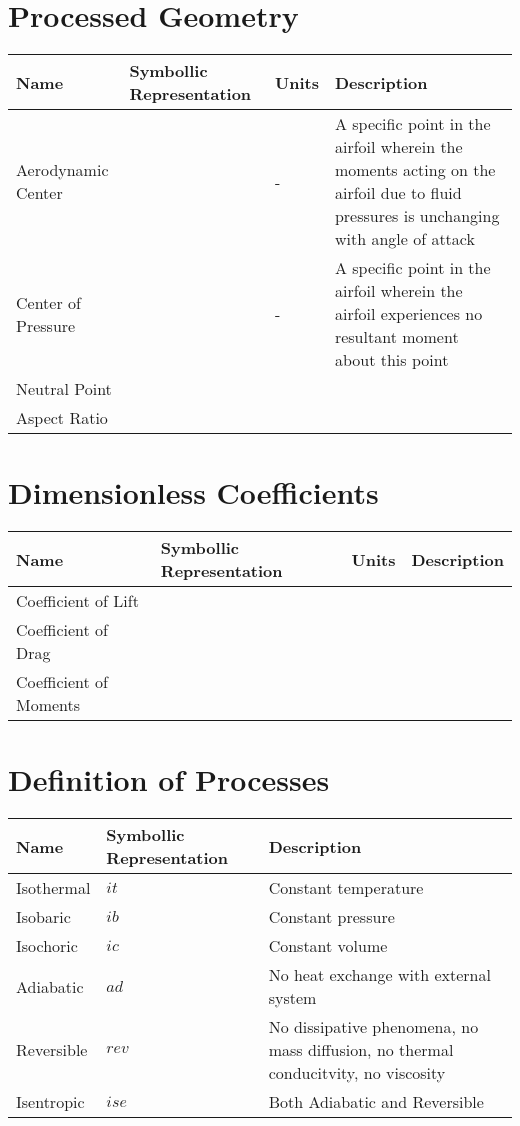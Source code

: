 \documentclass[class=report, 12pt, crop=false]{standalone}
\begin{document}
\begin{center}
\section{Processed Geometry}
\begin{comment}
\end{comment}
\begin{tabular}{|m{\tabsize}|m{\tabsize}|m{\tabsize}|m{\tabsizel}|}
\hline
Name & Symbollic Representation & Units & Description \\
\hline
Aerodynamic Center &  & - & A specific point in the airfoil wherein the moments acting on the airfoil due to fluid pressures is unchanging with angle of attack \\ 
\hline
Center of Pressure & & - & A specific point in the airfoil wherein the airfoil experiences no resultant moment about this point\\ 
\hline
Neutral Point & & & \\ 
\hline
Aspect Ratio & & & \\ 
\hline
\end{tabular}
\section{Dimensionless Coefficients}
\begin{comment}
\end{comment}
\begin{tabular}{|m{\tabsize}|m{\tabsize}|m{\tabsize}|m{\tabsize}|}
\hline
Name & Symbollic Representation & Units & Description \\
\hline
Coefficient of Lift & & & \\ 
\hline
Coefficient of Drag & & & \\ 
\hline
Coefficient of Moments & & & \\ 
\hline
\end{tabular}
\section{Definition of Processes}
\begin{comment}
\end{comment}
\begin{tabular}{|m{\tabsize}|m{\tabsize}|m{\tabsizel}|}
\hline
Name & Symbollic Representation & Description \\
\hline
Isothermal & $it$ & Constant temperature \\
\hline
Isobaric & $ib$ & Constant pressure \\
\hline
Isochoric & $ic$ & Constant volume \\
\hline
Adiabatic & $ad$ & No heat exchange with external system \\
\hline
Reversible & $rev$ & No dissipative phenomena, no mass diffusion, no thermal conducitvity, no viscosity \\
\hline
Isentropic & $ise$ & Both Adiabatic and Reversible \\
\hline
\end{tabular}
\end{center}
\end{document}
